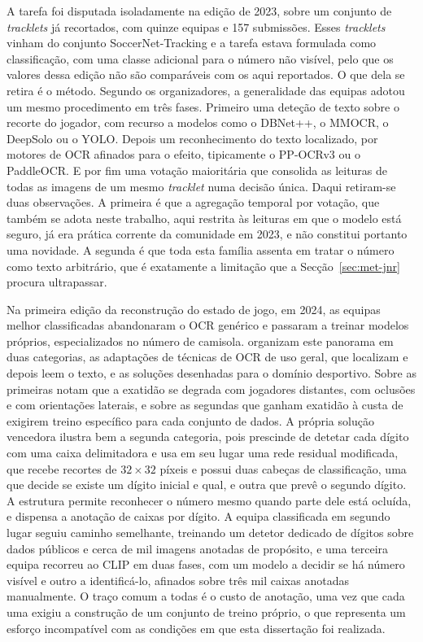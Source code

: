 A tarefa foi disputada isoladamente na edição de 2023, sobre um conjunto de
\emph{tracklets} já recortados, com quinze equipas e 157 submissões. Esses \emph{tracklets} vinham do conjunto SoccerNet-Tracking e a tarefa estava
formulada como classificação, com uma classe adicional para o número não visível, pelo que
os valores dessa edição não são comparáveis com os aqui reportados. O que dela se retira é
o método. Segundo os organizadores, a generalidade das equipas adotou um mesmo
procedimento em três fases. Primeiro uma deteção de texto sobre o recorte do jogador, com
recurso a modelos como o DBNet++, o MMOCR, o DeepSolo ou o YOLO. Depois um reconhecimento
do texto localizado, por motores de OCR afinados para o efeito, tipicamente o PP-OCRv3 ou
o PaddleOCR. E por fim uma votação maioritária que consolida as leituras de todas as
imagens de um mesmo \emph{tracklet} numa decisão única. Daqui retiram-se duas observações. A
primeira é que a agregação temporal por votação, que também se adota neste trabalho, aqui restrita às
leituras em que o modelo está seguro, já
era prática corrente da comunidade em 2023, e não constitui portanto uma novidade. A
segunda é que toda esta família assenta em tratar o número como texto arbitrário, que é
exatamente a limitação que a Secção~\ref{sec:met-jnr} procura ultrapassar.

Na primeira edição da reconstrução do estado de jogo, em 2024, as equipas melhor
classificadas abandonaram o OCR genérico e passaram a treinar modelos próprios,
especializados no número de camisola. \citet{golovkin2025minimap} organizam este panorama
em duas categorias, as adaptações de técnicas de OCR de uso geral, que localizam
e depois leem o texto, e as soluções desenhadas para o domínio desportivo. Sobre as
primeiras notam que a exatidão se degrada com jogadores distantes, com oclusões e com
orientações laterais, e sobre as segundas que ganham exatidão à custa de exigirem treino
específico para cada conjunto de dados. A própria solução vencedora ilustra bem a segunda
categoria, pois prescinde de detetar cada dígito com uma caixa delimitadora e usa em seu
lugar uma rede residual modificada, que recebe recortes de $32\times32$ píxeis e possui
duas cabeças de classificação, uma que decide se existe um dígito inicial e qual, e outra
que prevê o segundo dígito. A estrutura permite reconhecer o número mesmo quando parte
dele está ocluída, e dispensa a anotação de caixas por dígito. A equipa classificada em
segundo lugar seguiu caminho semelhante, treinando um detetor dedicado de dígitos sobre
dados públicos e cerca de mil imagens anotadas de propósito, e uma terceira equipa
recorreu ao CLIP em duas fases, com um modelo a decidir se há número visível e outro a
identificá-lo, afinados sobre três mil caixas anotadas manualmente. O traço comum a todas
é o custo de anotação, uma vez que cada uma exigiu a construção de um conjunto de treino
próprio, o que representa um esforço incompatível com as condições em que esta dissertação
foi realizada.

